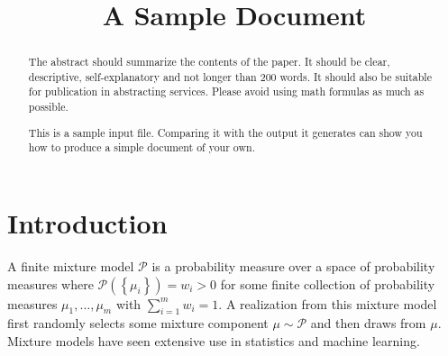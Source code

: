 \documentclass[aos]{imsart}
\def\sP{\mathscr{P}}
\theoremstyle{plain}
\theoremstyle{defintion}
\begin{document}
\begin{frontmatter}
\title{A Sample Document}


\begin{abstract}
The abstract should summarize the contents of the paper.
It should be clear, descriptive, self-explanatory and not longer
than 200 words. It should also be suitable for publication in
abstracting services. Please avoid using math formulas as much as possible.

This is a sample input file.  Comparing it with the output it
generates can show you how to produce a simple document of
your own.
\end{abstract}

\begin{keyword}[class=MSC]
\end{keyword}

\begin{keyword}
\kwd{\LaTeXe}
\end{keyword}

\end{frontmatter}

\section{Introduction}
A finite mixture model $\sP$ is a probability measure over a space of probability measures where $\sP\left( \left\{ \mu_i \right\} \right)=w_i >0$ for some finite collection of probability measures $\mu_1,\ldots,\mu_m$ with $\sum_{i=1}^m w_i = 1$. A realization from this mixture model first randomly selects some mixture component $\mu \sim \sP$ and then draws from $\mu$. Mixture models have seen extensive use in statistics and machine learning.
\end{document}
